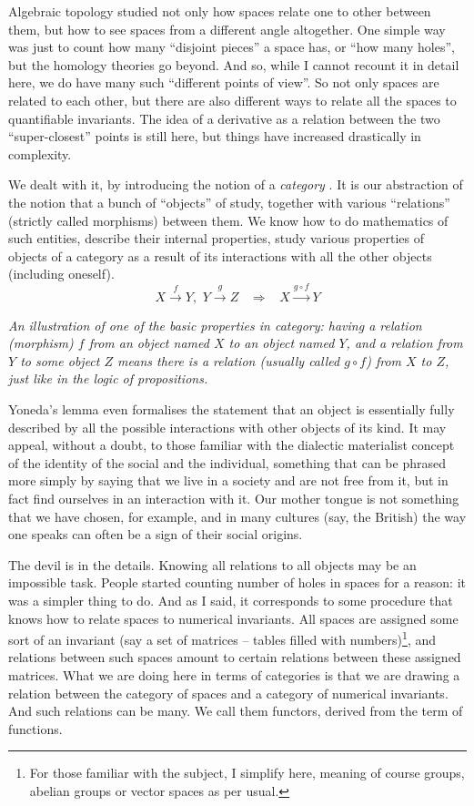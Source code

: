 \documentclass{article}
\begin{document}
Algebraic topology studied not only how spaces relate one to other between them, but how to see spaces from a different angle altogether. One simple way was just to count how many “disjoint pieces” a space has, or “how many holes”, but the homology theories go beyond. And so, while I cannot recount it in detail here, we do have many such “different points of view”. So not only spaces are related to each other, but there are also different ways to relate all the spaces to quantifiable invariants. The idea of a derivative as a relation between the two “super-closest” points is still here, but things have increased drastically in complexity.

We dealt with it, by introducing the notion of a \emph{category} \cite{EILMAC,MACLANE}. It is our abstraction of the notion that a bunch of “objects” of study, together with various “relations” (strictly called morphisms) between them. We know how to do mathematics of such entities, describe their internal properties, study various properties of objects of a category as a result of its interactions with all the other objects (including oneself).
$$
X \stackrel f \longrightarrow Y, \, \, Y \stackrel g \longrightarrow Z \, \, \, \, \, \Rightarrow \, \, \, \, \, X \stackrel{g \circ f}{\longrightarrow} Y
$$
\begin{center}
\textit{An illustration of one of the basic properties in category: having a relation (morphism) $f$ from an object named $X$ to an object named $Y$, and a relation from $Y$ to some object $Z$ means there is a relation (usually called $g \circ f$) from $X$ to $Z$, just like in the logic of propositions.}
\end{center}


Yoneda’s lemma \cite{MACLANE} even formalises the statement that an object is essentially fully described by all the possible interactions with other objects of its kind. It may appeal, without a doubt, to those familiar with the dialectic materialist concept of the identity of the social and the individual, something that can be phrased more simply by saying that we live in a society and are not free from it, but in fact find ourselves in an interaction with it. Our mother tongue is not something that we have chosen, for example, and in many cultures (say, the British) the way one speaks can often be a sign of their social origins.

The devil is in the details. Knowing all relations to all objects may be an impossible task. People started counting number of holes in spaces for a reason: it was a simpler thing to do. And as I said, it corresponds to some procedure that knows how to relate spaces to numerical invariants. All spaces are assigned some sort of an invariant (say a set of matrices – tables filled with numbers)\footnote{For those familiar with the subject, I simplify here, meaning of course groups, abelian groups or vector spaces as per usual.}, and relations between such spaces amount to certain relations between these assigned matrices. What we are doing here in terms of categories is that we are drawing a relation between the category of spaces and a category of numerical invariants. And such relations can be many. We call them functors, derived from the term of functions.
\end{document}
